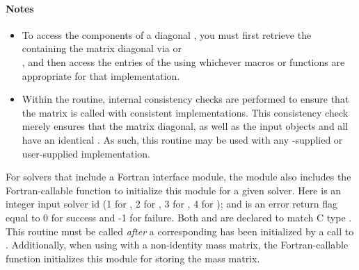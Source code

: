 \paragraph{\bf Notes}                                                      
           
\begin{itemize}
                                        
\item
  To access the components of a diagonal  , you
  must first retrieve the {\nvector} containing the matrix diagonal
  via  or\\
  , and then access the
  entries of the {\nvector} using whichever macros or functions are
  appropriate for that {\nvector} implementation.

\item
  Within the  routine, internal consistency
  checks are performed to ensure that the matrix is called with
  consistent {\nvector} implementations.  This consistency check
  merely ensures that the matrix diagonal, as well as the input 
  {\nvector} objects  and  all have an
  identical .  As such, this routine may be used
  with any {\sundials}-supplied or user-supplied {\nvector}
  implementation. 

\end{itemize}

For solvers that include a Fortran interface module, the {\sunmatdiag}
module also includes the Fortran-callable
function  to initialize
this {\sunmatdiag} module for a given {\sundials} solver.
Here  is an integer input solver id (1 for {\cvode}, 2 for {\ida}, 3
for {\kinsol}, 4 for {\arkode}); and  is an error return flag 
equal to 0 for success and -1 for failure. Both  and 
are declared to match C type . This routine must be
called \emph{after} a corresponding {\nvector} has been initialized by
a call to . Additionally, when using {\arkode} with a
non-identity mass matrix, the Fortran-callable
function  initializes this
{\sunmatdiag} module for storing the mass matrix.
